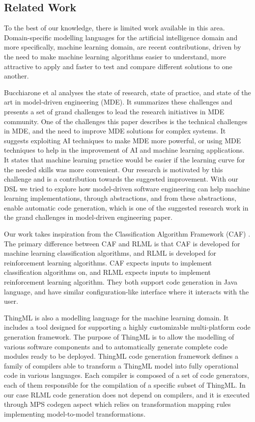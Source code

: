 \documentclass[11pt,letterpaper]{ryersonSGSThesis}
\begin{document}
\begin{ryersonSGSThesis}
\chapter{Related Work}
\label{chap:related work}
    To the best of our knowledge, there is limited work available in this area. Domain-specific modelling languages for the artificial intelligence domain and more specifically, machine learning domain, are recent contributions, driven by the need to make machine learning algorithms easier to understand, more attractive to apply and faster to test and compare different solutions to one another. 
    
    Bucchiarone et al \cite{Bucchiarone2020} analyses the state of research, state of practice, and state of the art in model-driven engineering (MDE). It summarizes these challenges and presents a set of grand challenges to lead the research initiatives in MDE community. One of the challenges this paper describes is the technical challenges in MDE, and the need to improve MDE solutions for complex systems. It suggests exploiting AI techniques to make MDE more powerful, or using MDE techniques to help in the improvement of AI and machine learning applications. It states that machine learning practice would be easier if the learning curve for the needed skills was more convenient. Our research is motivated by this challenge and is a contribution towards the suggested improvement. With our DSL we tried to explore how model-driven software engineering can help machine learning implementations, through abstractions, and from these abstractions, enable automatic code generation, which is one of the suggested research work in the grand challenges in model-driven engineering paper.
    
    Our work takes inspiration from the Classification Algorithm Framework (CAF) \cite{meacham2020}. The primary difference between CAF and RLML is that CAF is developed for machine learning classification algorithms, and RLML is developed for reinforcement learning algorithms. CAF expects inputs to implement classification algorithms on, and RLML expects inputs to implement reinforcement learning algorithm. They both support code generation in Java language, and have similar configuration-like interface where it interacts with the user.
    
    ThingML \cite{Harrand2016} is also a modelling language for the machine learning domain. It includes a tool designed for supporting a highly customizable multi-platform code generation framework. The purpose of ThingML is to allow the modelling of various software components and to automatically generate complete code modules ready to be deployed. ThingML code generation framework defines a family of compilers able to transform a ThingML model into fully operational code in various languages. Each compiler is composed of a set of code generators, each of them responsible for the compilation of a specific subset of ThingML. In our case RLML code generation does not depend on compilers, and it is executed through MPS codegen aspect which relies on transformation mapping rules implementing model-to-model transformations.
    

\end{ryersonSGSThesis}
\end{document}
